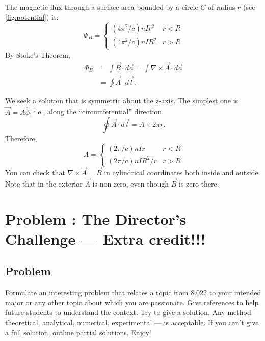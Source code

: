 \documentclass[solutions]{esg8022pset}
\begin{document}
  The  magnetic flux through a surface area bounded by a circle $C$ of radius
  $r$ (see \autoref{fig:potential}) is:
  \begin{equation}
    \Phi_B = \begin{cases} (4\pi^2/c)nIr^2 & r<R\\ (4\pi^2/c)nIR^2 & r>R \end{cases}
  \end{equation}
  By Stoke's Theorem,
  \begin{align*}
    \Phi_B & = \int \vec{B}\cdot d\vec{a}=\int \nabla\times\vec{A}\cdot d\vec{a}\\
           & = \oint \vec{A}\cdot d\vec{l}.
  \end{align*}

  We seek a solution that is symmetric about the z-axis.  The simplest one is
  $\vec{A}=A\hat\phi$, i.e., along the ``circumferential'' direction.
  \[ \oint \vec{A}\cdot d\vec{l} = A\times 2\pi r.\]
  Therefore,
  \begin{equation}
    A = \begin{cases} (2\pi/c)nIr & r<R\\ (2\pi/c)nIR^2/r & r>R \end{cases}
  \end{equation}
  You can check  that $\nabla\times \vec{A}=\vec{B}$ in cylindrical coordinates
  both inside and outside.  Note that in the exterior $\vec{A}$ is non-zero,
  even though $\vec{B}$ is zero there.
\section{Problem \thesection: The Director's Challenge --- Extra credit!!!}
\subsection{Problem}
  Formulate an interesting problem that relates a topic from 8.022 to your
  intended major or any other topic about which you are passionate.  Give references
  to help future students to understand the context.  Try to give a solution.
  Any method --- theoretical, analytical, numerical, experimental --- is acceptable.
  If you can't give a full solution, outline partial solutions. Enjoy!
\end{document}

